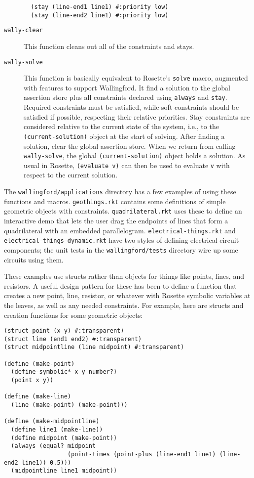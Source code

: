 \documentclass{article}
\begin{document}
\begin{description}
  \begin{verbatim}
  (stay (line-end1 line1) #:priority low)
  (stay (line-end2 line1) #:priority low)
  \end{verbatim}

\item[{\tt wally-clear}]  This function cleans out all of the constraints
  and stays.

\item[{\tt wally-solve}] This function is basically equivalent to
  Rosette's {\tt solve} macro, augmented with features to support
  Wallingford.  It find a solution to the global assertion store plus
  all constraints declared using \verb|always| and \verb|stay|.
  Required constraints must be satisfied, while soft constraints
  should be satisfied if possible, respecting their relative
  priorities.  Stay constraints are considered relative to the current
  state of the system, i.e., to the \verb|(current-solution)| object
  at the start of solving.  After finding a solution, clear the global
  assertion store.  When we return from calling \verb|wally-solve|,
  the global \verb|(current-solution)| object holds a solution.  As
  usual in Rosette, \verb|(evaluate v)| can then be used to evaluate
  \verb|v| with respect to the current solution.

\end{description}

The \verb|wallingford/applications| directory has a few examples of using
these functions and macros.  \verb|geothings.rkt| contains some definitions
of simple geometric objects with constraints. \verb|quadrilateral.rkt| uses
these to define an interactive demo that lets the user drag the endpoints
of lines that form a quadrilateral with an embedded parallelogram.
\verb|electrical-things.rkt| and \verb|electrical-things-dynamic.rkt| have
two styles of defining electrical circuit components; the unit tests in the
\verb|wallingford/tests| directory wire up some circuits using them.

These examples use structs rather than objects for things like points,
lines, and resistors.  A useful design pattern for these has been to
define a function that creates a new point, line, resistor, or
whatever with Rosette symbolic variables at the leaves, as well as any
needed constraints.  For example, here are structs and creation
functions for some geometric objects:

\begin{verbatim}
(struct point (x y) #:transparent)
(struct line (end1 end2) #:transparent)
(struct midpointline (line midpoint) #:transparent)

(define (make-point)
  (define-symbolic* x y number?)
  (point x y))

(define (make-line)
  (line (make-point) (make-point)))

(define (make-midpointline)
  (define line1 (make-line))
  (define midpoint (make-point))
  (always (equal? midpoint
                  (point-times (point-plus (line-end1 line1) (line-end2 line1)) 0.5)))
  (midpointline line1 midpoint))
\end{verbatim}
\end{document}

